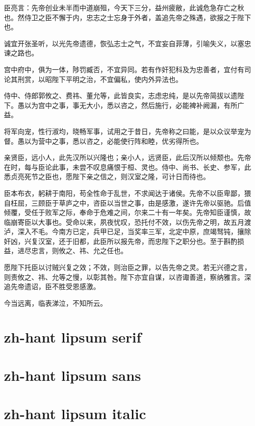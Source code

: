 \documentclass[a4paper,12pt, fontset=none, hyperref]{ctexbook}
\begin{document}
		臣亮言：先帝创业未半而中道崩殂，今天下三分，益州疲敝，此诚危急存亡之秋也。然侍卫之臣不懈于内，忠志之士忘身于外者，盖追先帝之殊遇，欲报之于陛下也。
		
		诚宜开张圣听，以光先帝遗德，恢弘志士之气，不宜妄自菲薄，引喻失义，以塞忠谏之路也。
		
		宫中府中，俱为一体，陟罚臧否，不宜异同。若有作奸犯科及为忠善者，宜付有司论其刑赏，以昭陛下平明之治，不宜偏私，使内外异法也。
		
		侍中、侍郎郭攸之、费祎、董允等，此皆良实，志虑忠纯，是以先帝简拔以遗陛下。愚以为宫中之事，事无大小，悉以咨之，然后施行，必能裨补阙漏，有所广益。
		
		将军向宠，性行淑均，晓畅军事，试用之于昔日，先帝称之曰能，是以众议举宠为督。愚以为营中之事，悉以咨之，必能使行阵和睦，优劣得所也。
		
		亲贤臣，远小人，此先汉所以兴隆也；亲小人，远贤臣，此后汉所以倾颓也。先帝在时，每与臣论此事，未尝不叹息痛恨于桓、灵也。侍中、尚书、长史、参军，此悉贞亮死节之臣也，愿陛下亲之信之，则汉室之隆，可计日而待也。
		
		臣本布衣，躬耕于南阳，苟全性命于乱世，不求闻达于诸侯。先帝不以臣卑鄙，猥自枉屈，三顾臣于草庐之中，咨臣以当世之事，由是感激，遂许先帝以驱驰。后值倾覆，受任于败军之际，奉命于危难之间，尔来二十有一年矣。先帝知臣谨慎，故临崩寄臣以大事也。受命以来，夙夜忧叹，恐托付不效，以伤先帝之明，故五月渡泸，深入不毛。今南方已定，兵甲已足，当奖率三军，北定中原，庶竭驽钝，攘除奸凶，兴复汉室，还于旧都，此臣所以报先帝，而忠陛下之职分也。至于斟酌损益，进尽忠言，则攸之、祎、允之任也。
		
		愿陛下托臣以讨贼兴复之效；不效，则治臣之罪，以告先帝之灵。若无兴德之言，则责攸之、祎、允等之慢，以彰其咎。陛下亦宜自谋，以咨诹善道，察纳雅言。深追先帝遗诏，臣不胜受恩感激。
		
		今当远离，临表涕泣，不知所云。

	\chapter{zh-hant lipsum serif}

		\zhlipsum[1-20][name=trad]

	\chapter{zh-hant lipsum sans}

		\textbf{\zhlipsum[1-20][name=xiangyu]}
		
	\chapter{zh-hant lipsum italic}
	
\end{document}

